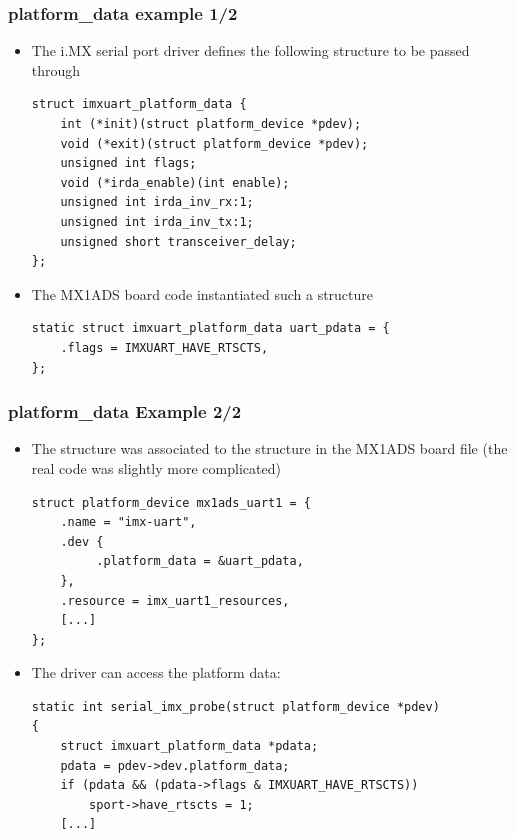 \begin{frame}[fragile]
  \frametitle{platform\_data example 1/2}
  \begin{itemize}
  \item The i.MX serial port driver defines the following structure to
    be passed through 
    \begin{block}{}
  \begin{verbatim}
struct imxuart_platform_data {
    int (*init)(struct platform_device *pdev);
    void (*exit)(struct platform_device *pdev);
    unsigned int flags;
    void (*irda_enable)(int enable);
    unsigned int irda_inv_rx:1;
    unsigned int irda_inv_tx:1;
    unsigned short transceiver_delay;
};
  \end{verbatim}
  \end{block}
  \item The MX1ADS board code instantiated such a structure
    \begin{block}{}
  \begin{verbatim}
static struct imxuart_platform_data uart_pdata = {
    .flags = IMXUART_HAVE_RTSCTS,
};
  \end{verbatim}
  \end{block}
  \end{itemize}
\end{frame}

\begin{frame}[fragile]
  \frametitle{platform\_data Example 2/2}
  \begin{itemize}
  \item The  structure was associated to the
     structure in the MX1ADS board file (the
    real code was slightly more complicated)
    \begin{block}{}
  \begin{verbatim}
struct platform_device mx1ads_uart1 = {
    .name = "imx-uart",
    .dev {
         .platform_data = &uart_pdata,
    },
    .resource = imx_uart1_resources,
    [...]
};
  \end{verbatim}
  \end{block}
  \item The driver can access the platform data:
    \begin{block}{}
  \begin{verbatim}
static int serial_imx_probe(struct platform_device *pdev)
{
    struct imxuart_platform_data *pdata;
    pdata = pdev->dev.platform_data;
    if (pdata && (pdata->flags & IMXUART_HAVE_RTSCTS))
        sport->have_rtscts = 1;
    [...]
  \end{verbatim}
  \end{block}
\end{itemize}
\end{frame}

